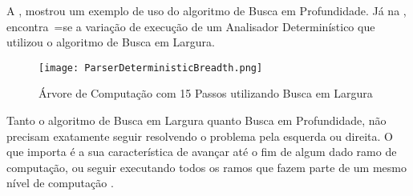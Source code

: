 A ,
mostrou um exemplo de uso do algoritmo de Busca em Profundidade.
Já na ,
encontra~=se a variação de execução de um Analisador Determinístico que utilizou o algoritmo de Busca em Largura.
\begin{figure}[!htb]
\caption{Árvore de Computação com 15 Passos\protect\footnotemark{} utilizando Busca em Largura}
\label{ParserDeterministicBreadth}
\centering
\texttt{[image: ParserDeterministicBreadth.png]}
\end{figure}

Tanto o algoritmo de Busca em Largura quanto Busca em Profundidade,
não precisam exatamente seguir resolvendo o problema pela esquerda ou
direita.
O que importa é a sua característica de avançar até o fim de algum dado ramo de computação,
ou seguir executando todos os ramos que fazem parte de um mesmo nível de computação \cite{cormenIntroductionToAlgorithms,efficientBreadthFirstSearch}.

